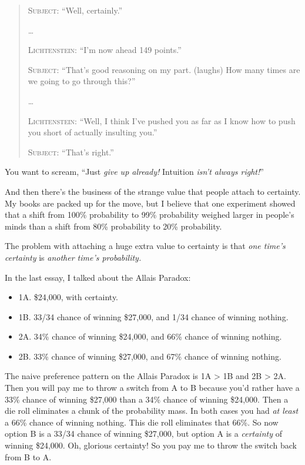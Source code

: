 \begin{quotation}
 \textsc{Subject}: ``Well, certainly.''


 \ldots


 \textsc{Lichtenstein}: ``I'm now ahead 149
points.''


 \textsc{Subject}: ``That's good reasoning
on my part. (laughs) How many times are we going to go through
this?''


 \ldots


 \textsc{Lichtenstein}: ``Well, I think
I've pushed you as far as I know how to push you short
of actually insulting you.''

{
 \textsc{Subject}: ``That's
 right.''}
\end{quotation}

{
 You want to scream, ``Just \textit{give up
already!} Intuition \textit{isn't always
right!}''}


 And then there's the business of the strange value
that people attach to certainty. My books are packed up for the move,
but I believe that one experiment showed that a shift from 100\%
probability to 99\% probability weighed larger in
people's minds than a shift from 80\% probability to
20\% probability.

{
 The problem with attaching a huge extra value to certainty is that
\textit{one time's certainty} is \textit{another
time's probability.}}


 In the last essay, I talked about the Allais Paradox:

\begin{itemize}
\item {
 1A. \$24,000, with certainty.}

\item {
 1B. 33/34 chance of winning \$27,000, and 1/34 chance of winning
nothing.}

\item {
 2A. 34\% chance of winning \$24,000, and 66\% chance of winning
nothing.}

\item {
 2B. 33\% chance of winning \$27,000, and 67\% chance of winning
 nothing.}
\end{itemize}


 The naive preference pattern on the Allais Paradox is 1A
{\textgreater} 1B and 2B {\textgreater} 2A. Then you will pay me to
throw a switch from A to B because you'd rather have a
33\% chance of winning \$27,000 than a 34\% chance of winning \$24,000.
Then a die roll eliminates a chunk of the probability mass. In both
cases you had \textit{at least} a 66\% chance of winning nothing. This
die roll eliminates that 66\%. So now option B is a 33/34 chance of
winning \$27,000, but option A is a \textit{certainty} of winning
\$24,000. Oh, glorious certainty! So you pay me to throw the switch
back from B to A.


